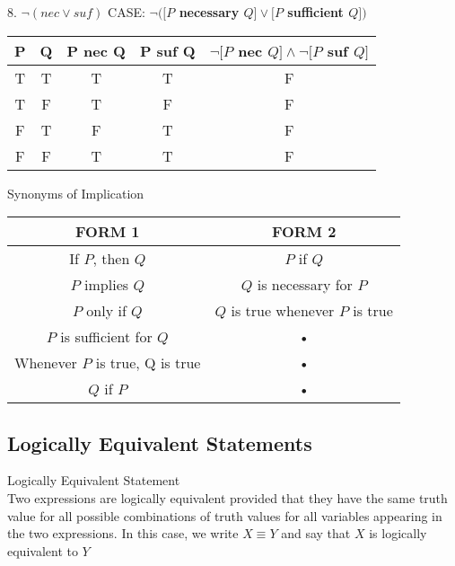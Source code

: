 \begin{definition}
8. $\neg(nec \vee suf)$ CASE: {\bf $\neg([P$ necessary $Q] \vee [P$ sufficient $Q])$} \\
\begin{center}
\begin{tabular}{|c|c|c|c|c|}
\hline 
P & Q & P nec Q & P suf Q & $\neg[P$ nec $Q] \wedge \neg[P$ suf $Q]$  \\ 
\hline 
T & T & T & T & F\\ 
\hline 
T & F & T & F & F\\ 
\hline 
F & T & F & T & F\\ 
\hline 
F & F & T & T & F\\ 
\hline 
\end{tabular} 
\end{center} 
\end{definition}

\begin{definition}
Synonyms of Implication

\begin{center}
\begin{tabular}{|c|c|}
\hline 
FORM 1 & FORM 2 \\ 
\hline 
If $P$, then $Q$ & $P$ if $Q$ \\ 
\hline 
$P$ implies $Q$ & $Q$ is necessary for $P$ \\ 
\hline 
$P$ only if $Q$ & $Q$ is true whenever $P$ is true \\ 
\hline 
$P$ is sufficient for $Q$ & • \\ 
\hline 
Whenever $P$ is true, Q is true & • \\ 
\hline 
$Q$ if $P$ & • \\ 
\hline 
\end{tabular} 
\end{center}
\end{definition}



\newpage
\subsection{Logically Equivalent Statements}
\begin{definition}
Logically Equivalent Statement \\

Two expressions are logically equivalent provided that they have the same truth value for all possible combinations of truth values for all variables appearing in the two expressions. In this case, we write $X \equiv Y$ and say that $X$ is logically equivalent to $Y$ \\
\end{definition}

